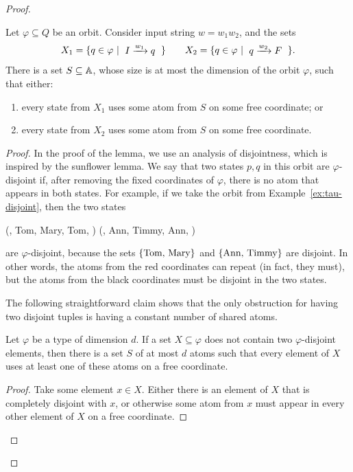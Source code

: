\begin{proof}
    \begin{lemma}\label{lem:fixed-atoms}
        Let  $\varphi \subseteq Q$ be an orbit.  Consider   input string  $w = w_1 w_2$, and the sets
        \begin{align*}
        X_1 = \setbuild{ q \in \varphi}{$ I \xrightarrow{w_1} q$}
        \qquad
        X_2 = \setbuild{ q \in \varphi}{$ q \xrightarrow{w_2} F$}.
        \end{align*}
        There is a set $S \subseteq \mathbb A$, whose size is at most the dimension of the orbit $\varphi$, such that either: 
\begin{enumerate}
    \item   every state from $X_1$ uses some atom from $S$ on some free coordinate; or 
    \item   every state from $X_2$ uses some atom from $S$ on some free coordinate.
\end{enumerate}
    \end{lemma}
    \begin{proof}
        In the proof of the lemma, we use an analysis of disjointness, which is inspired by the sunflower lemma.
 We say that two states $p,q$ in this orbit are $\varphi$-disjoint if, after removing the fixed coordinates of $\varphi$, there is no atom that appears in both states. For example, if we take the orbit from Example~\ref{ex:tau-disjoint}, then the two states
\begin{center}
    (, Tom, Mary, Tom, ) \qquad
    (, Ann, Timmy, Ann, )
\end{center}
are $\varphi$-disjoint, because the sets $\{\text{Tom, Mary}\}$ and $\{\text{Ann, Timmy}\}$ are disjoint. In other words, the atoms from the  red coordinates can repeat (in fact, they must), but the atoms from the  black coordinates must be disjoint in the two states. 

The following straightforward claim shows that the only obstruction for having two disjoint tuples is having a constant number of shared atoms.
        \begin{claim}\label{claim:sunflower}
            Let $\varphi$ be a type of dimension $d$. If a set $X \subseteq \varphi$ does not contain two $\varphi$-disjoint elements, then there is a set $S$ of at most $d$ atoms such that  every element of $X$ uses at least one of these atoms on a free coordinate.
        \end{claim}
        \begin{proof}
            Take some element $x \in X$. Either there is an element  of $X$ that is completely disjoint with $x$, or otherwise some atom from $x$ must appear in every other element of $X$ on a free coordinate.
        \end{proof}


\end{proof}
\end{proof}
